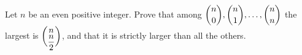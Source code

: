 Let $n$ be an even positive integer. Prove that among $\dbinom n0,\dbinom n1,\dots,\dbinom nn$ the largest is $\dbinom{n}{\dfrac {n}{2}}$, and that it is strictly larger than all the others.
